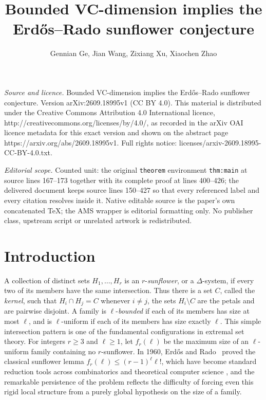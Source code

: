 \documentclass[10pt,a4paper]{amsart}
\begin{document}
\title[Bounded VC-dimension implies the ErdHos--Rado sunflower conj]{Bounded VC-dimension implies the Erd\H{o}s--Rado sunflower conjecture}
\author{Gennian Ge, Jian Wang, Zixiang Xu, Xiaochen Zhao}
\date{}
\maketitle
\noindent\emph{Source and licence.} Bounded VC-dimension implies the Erd\H{o}s--Rado sunflower conjecture. Version arXiv:2609.18995v1 (CC BY 4.0). This material is distributed under the Creative Commons Attribution 4.0 International licence, http://creativecommons.org/licenses/by/4.0/, as recorded in the arXiv OAI licence metadata for this exact version and shown on the abstract page https://arxiv.org/abs/2609.18995v1. Full rights notice: licenses/arxiv-2609.18995-CC-BY-4.0.txt.\par\smallskip
\noindent\textit{Editorial scope.} Counted unit: the original \texttt{theorem} environment \texttt{thm:main} at source lines 167--173 together with its complete proof at lines 400--426; the delivered document keeps source lines 150--427 so that every referenced label and every citation resolves inside it. Native editable source is the paper's own concatenated TeX; the AMS wrapper is editorial formatting only. No publisher class, upstream script or unrelated artwork is redistributed.
\section{Introduction}

A collection of distinct sets \(H_{1},\ldots,H_{r}\) is an \(r\)-\emph{sunflower}, or a \(\Delta\)-system, if every two of its members have the same intersection. Thus there is a set \(C\), called the \emph{kernel}, such that \(H_{i}\cap H_{j}=C\) whenever \(i\ne j\), the sets \(H_{i}\setminus C\) are the petals and are pairwise disjoint. A family is \(\ell\)-\emph{bounded} if each of its members has size at most \(\ell\), and is \(\ell\)-uniform if each of its members has size exactly \(\ell\). This simple intersection pattern is one of the fundamental configurations in extremal set theory. For integers \(r\ge 3\) and \(\ell\ge 1\), let \(f_{r}(\ell)\) be the maximum size of an \(\ell\)-uniform family containing no \(r\)-sunflower. In 1960, Erd\H{o}s and Rado~\cite{ER60} proved the classical sunflower lemma \(f_{r}(\ell)\le (r-1)^{\ell}\ell!\), which have become standard reduction tools across combinatorics and theoretical computer science \cite{AB87,CKR22,DV25,FLSZ19,GMR13,LLZ18,LMMPZ22,NSR18,RA20,Rao26,R85}, and the remarkable persistence of the problem reflects the difficulty of forcing even this rigid local structure from a purely global hypothesis on the size of a family.
\end{document}
